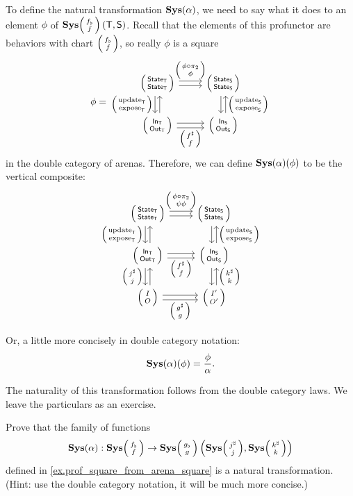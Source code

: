 \documentclass[DynamicalBook]{subfiles}
\begin{document}
\begin{example}
To define the natural transformation $\textbf{Sys}(\alpha)$, we need to say what it
does to an element $\phi$ of $\Cat{Sys}\lens{f_{\flat}}{f}\left(\Sys{T},
  \Sys{S}\right)$. Recall that the elements of this profunctor are behaviors with
  chart $\lens{f_{\flat}}{f}$, so really $\phi$ is a square
\[
  \phi =
    \begin{tikzcd}
      \lens{\State{T}}{\State{T}} \ar[r, shift left, "\lens{\phi \circ
        \pi_2}{\phi}"] \ar[r, shift right] \ar[d, shift right,
      "\lens{\update{T}}{\expose{T}}"'] \ar[d, shift left, leftarrow] &
      \lens{\State{S}}{\State{S}} \ar[d, shift left, leftarrow,
      "\lens{\update{S}}{\expose{S}}"] \ar[d, shift right]\\
      \lens{\In{T}}{\Out{T}} \ar[r, shift right, "\lens{f^{\sharp}}{f}"'] \ar[r,
      shift left] & \lens{\In{S}}{\Out{S}}
    \end{tikzcd}
\]
in the double category of arenas. Therefore, we can define
$\textbf{Sys}(\alpha)(\phi)$ to be the vertical composite:
\[
  \begin{tikzcd}
    \lens{\State{T}}{\State{T}} \ar[r, shift left, "\lens{\phi \circ
      \pi_2}{\psi\phi}"] \ar[r, shift right] \ar[d, shift right,
    "\lens{\update{T}}{\expose{T}}"'] \ar[d, shift left, leftarrow] &
    \lens{\State{S}}{\State{S}} \ar[d, shift left, leftarrow,
    "\lens{\update{S}}{\expose{S}}"] \ar[d, shift right]\\
    \lens{\In{T}}{\Out{T}} \ar[d, shift right, "\lens{j^{\sharp}}{j}"'] \ar[d, shift left,
        leftarrow] \ar[r, shift right, "\lens{f^{\sharp}}{f}"']
    \ar[r, shift left] & \lens{\In{S}}{\Out{S}} \ar[d, shift left, leftarrow,
        "\lens{k^{\sharp}}{k}"] \ar[d, shift right]\\
    \lens{I}{O} \ar[r, shift right, "\lens{g^{\sharp}}{g}"']
    \ar[r, shift left] & \lens{I'}{O'} \\
  \end{tikzcd}
\]
Or, a little more concisely in double category notation:
$$\textbf{Sys}(\alpha)(\phi) = \frac{\phi}{\alpha}.$$

The naturality of this transformation follows from the double category laws. We
leave the particulars as an exercise.
\end{example}

\begin{exercise}\label{ex.prof_square_from_arena_square_naturality}
  Prove that the family of functions 
  \[
\Cat{Sys}(\alpha) : \Cat{Sys}\lens{f_{\flat}}{f} \to
\Cat{Sys}\lens{g_{\flat}}{g}\left( \Cat{Sys}\littlelens{j^{\sharp}}{j}, \Cat{Sys}\littlelens{k^{\sharp}}{k} \right)
\]
defined in \cref{ex.prof_square_from_arena_square} is a natural transformation.
(Hint: use the double category notation, it will be much more concise.)
\end{exercise}
\end{document}
